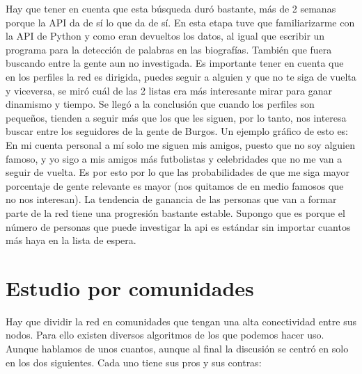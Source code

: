 Hay que tener en cuenta que esta búsqueda duró bastante, más de 2 semanas porque la API da de sí lo que da de sí.
En esta etapa tuve que familiarizarme con la API de Python y como eran devueltos los datos, al igual que escribir un programa para la detección de palabras en las biografías. También que fuera buscando entre la gente aun no investigada.
Es importante tener en cuenta que en los perfiles la red es dirigida, puedes seguir a alguien y que no te siga de vuelta y viceversa, se miró cuál de las 2 listas era más interesante mirar para ganar dinamismo y tiempo. Se llegó a la conclusión que cuando los perfiles son pequeños, tienden a seguir más que los que les siguen, por lo tanto, nos interesa buscar entre los seguidores de la gente de Burgos. Un ejemplo gráfico de esto es: En mi cuenta personal a mí solo me siguen mis amigos, puesto que no soy alguien famoso, y yo sigo a mis amigos más futbolistas y celebridades que no me van a seguir de vuelta. Es por esto por lo que las probabilidades de que me siga mayor porcentaje de gente relevante es mayor (nos quitamos de en medio famosos que no nos interesan).
La tendencia de ganancia de las personas que van a formar parte de la red tiene una progresión bastante estable. Supongo que es porque el número de personas que puede investigar la api es estándar sin importar cuantos más haya en la lista de espera.


\section{Estudio por comunidades}

Hay que dividir la red en comunidades que tengan una alta conectividad entre sus nodos. Para ello existen diversos algoritmos de los que podemos hacer uso. Aunque hablamos de unos cuantos, aunque al final la discusión se centró en solo en los dos siguientes. Cada uno tiene sus pros y sus contras:

